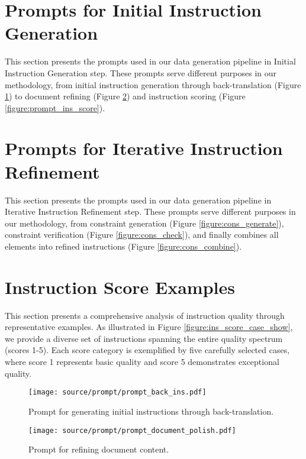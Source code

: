 \section{Prompts for Initial Instruction Generation}
\label{appendix:prompt_iig}

This section presents the prompts used in our data generation pipeline in Initial Instruction Generation step. These prompts serve different purposes in our methodology, from initial instruction generation through back-translation (Figure \ref{figure:prompt_back_ins}) to document refining (Figure \ref{figure:prompt_document_polish}) and instruction scoring (Figure \ref{figure:prompt_ins_score}). 

\section{Prompts for Iterative Instruction Refinement}
\label{appendix:prompt_iir}

This section presents the prompts used in our data generation pipeline in Iterative Instruction Refinement step. These prompts serve different purposes in our methodology, from constraint generation (Figure \ref{figure:cons_generate}), constraint verification (Figure \ref{figure:cons_check}), and finally combines all elements into refined instructions (Figure \ref{figure:cons_combine}).


\section{Instruction Score Examples}
\label{appendix:ins_score_case}

This section presents a comprehensive analysis of instruction quality through representative examples. As illustrated in Figure \ref{figure:ins_score_case_show}, we provide a diverse set of instructions spanning the entire quality spectrum (scores 1-5). Each score category is exemplified by five carefully selected cases, where score 1 represents basic quality and score 5 demonstrates exceptional quality.



\begin{figure}[h]
\centering
\texttt{[image: source/prompt/prompt\_back\_ins.pdf]}
\caption{Prompt for generating initial instructions through back-translation.}
\label{figure:prompt_back_ins}
\end{figure}

\begin{figure}[h]
\centering
\texttt{[image: source/prompt/prompt\_document\_polish.pdf]}
\caption{Prompt for refining document content.}
\label{figure:prompt_document_polish}
\end{figure}

